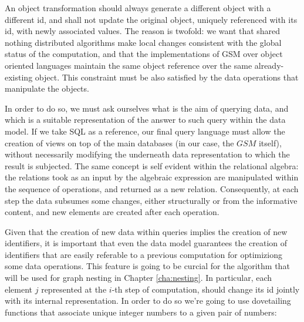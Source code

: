 
An object transformation should always generate a different object with a different id, and shall not update the original object, uniquely referenced with its id, with newly associated values. The reason is twofold: we want that shared nothing distributed algorithms make local changes consistent with the global status of the computation, and that the implementations of GSM over object oriented languages maintain the same object reference over the same already-existing object.  This constraint must be also satisfied by the data operations that manipulate the objects.

In order to do so, we must ask ourselves what is the aim of querying data, and which is a suitable representation of the answer to such query within the data model. If we take SQL as a reference, our final query language must allow the creation of views on top of the main databases (in our case, the $GSM$ itself), without necessarily modifying the underneath data representation to which the result is subjected. The same concept is self evident within the relational algebra: the relations took as an input by the algebraic expression are manipulated within the sequence of operations, and returned as a new relation. Consequently, at each step the data subsumes some changes, either structurally or from the informative content, and new elements are created after each operation. 



Given that the creation of new data within queries implies the creation of new identifiers, it is important that even the data model guarantees the creation of identifiers that are easily referable to a previous computation \cite{bergami2014} for optimiziong some data operations. This feature is going to be curcial for the algorithm that will be used for graph nesting in Chapter \vref{cha:nesting}. In particular, each element $j$ represented at the $i$-th step of computation, should change its id  jointly with its internal representation. In order to do so we're going to use dovetailing functions \cite{odifreddi1992} that associate unique integer numbers to a given pair of numbers:

